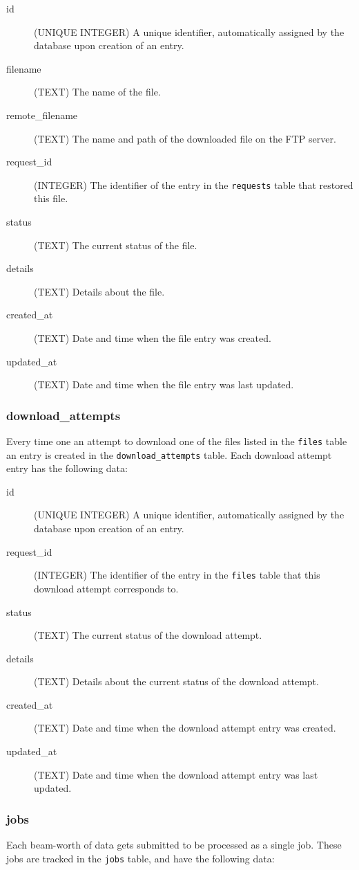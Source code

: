 \documentclass[12pt]{article}
\begin{document}
\begin{description}
    \item[id] (UNIQUE INTEGER)  A unique identifier, automatically assigned by the database upon creation of an entry.
    \item[filename] (TEXT) The name of the file.
    \item[remote\_filename] (TEXT) The name and path of the downloaded file on the FTP server.
    \item[request\_id] (INTEGER) The identifier of the entry in the \texttt{requests} table that restored this file.
    \item[status] (TEXT) The current status of the file.
    \item[details] (TEXT) Details about the file.
    \item[created\_at] (TEXT) Date and time when the file entry was created.
    \item[updated\_at] (TEXT) Date and time when the file entry was last updated.
\end{description}

\subsubsection{download\_attempts}
Every time one an attempt to download one of the files listed in the \texttt{files} table an entry is created in the \texttt{download\_attempts} table. Each download attempt entry has the following data:

\begin{description}
    \item[id] (UNIQUE INTEGER)  A unique identifier, automatically assigned by the database upon creation of an entry.
    \item[request\_id] (INTEGER) The identifier of the entry in the \texttt{files} table that this download attempt corresponds to.
    \item[status] (TEXT) The current status of the download attempt.
    \item[details] (TEXT) Details about the current status of the download attempt.
    \item[created\_at] (TEXT) Date and time when the download attempt entry was created.
    \item[updated\_at] (TEXT) Date and time when the download attempt entry was last updated.
\end{description}

\subsubsection{jobs}
Each beam-worth of data gets submitted to be processed as a single job. These jobs are tracked in the \texttt{jobs} table, and have the following data:
\end{document}

